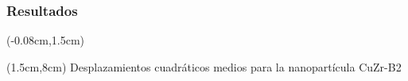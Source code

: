 \begin{frame}
 \frametitle{Resultados}
 
 \begin{textblock*}{12.6cm}(-0.08cm,1.5cm) 
      \begin{figure}[htp]
	\centering
      \end{figure}
    \end{textblock*}
    \begin{textblock*}{10cm}(1.5cm,8cm) 
    \centering
      Desplazamientos cuadr\'aticos medios para la nanopart\'icula CuZr-B2
 \end{textblock*}
\end{frame}

